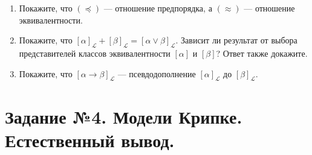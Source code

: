 \documentclass[10pt,a4paper,oneside]{article}
\begin{document}
\begin{enumerate}
\item Покажите, что $(\preceq)$ --- отношение предпорядка, а $(\approx)$ --- отношение эквивалентности.
\item Покажите, что $[\alpha]_\mathcal{L} + [\beta]_\mathcal{L} = [\alpha\vee\beta]_\mathcal{L}$.
Зависит ли результат от выбора представителей классов эквивалентности $[\alpha]$ и $[\beta]$? Ответ также докажите.
\item Покажите, что $[\alpha\rightarrow\beta]_\mathcal{L}$ --- псевдодополнение $[\alpha]_\mathcal{L}$ до $[\beta]_\mathcal{L}$.
\end{enumerate}

\section*{Задание №4. Модели Крипке. Естественный вывод.}
\end{document}

